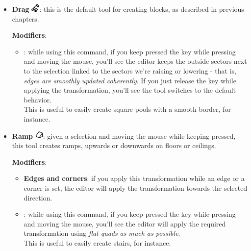 
\begin{itemize}
    \item \textbf{Drag} \includegraphics[scale=0.5]{Resources/icons_toolbox/toolbox_Drag-16.png}: this is the default tool for creating blocks, as described in previous chapters.
    \par \textbf{Modifiers}:
    \begin{itemize}
        \item \keys{\Alt}: while using this command, if you keep pressed the \keys{\Alt} key while pressing  and moving the mouse, you'll see the editor keeps the outside sectors next to the selection linked to the sectors we're raising or lowering - that is, \emph{edges are smoothly updated coherently}. If you just release the \keys{\Alt} key while applying the transformation, you'll see the tool switches to the default behavior. \\ This is useful to easily create square pools with a smooth border, for instance. 
    \end{itemize}

    \item \textbf{Ramp} \includegraphics[scale=0.5]{Resources/icons_toolbox/toolbox_GroupRamp-16.png}: given a selection and moving the mouse while keeping  pressed, this tool creates ramps, upwards or downwards on floors or ceilings.
    \par \textbf{Modifiers}:
    \begin{itemize}
        \item \textbf{Edges and corners}: if you apply this transformation while an edge or a corner is set, the editor will apply the transformation towards the selected direction.
        \item \keys{\Alt}: while using this command, if you keep pressed the \keys{\Alt} key while pressing  and moving the mouse, you'll see the editor will apply the required transformation using \emph{flat quads} \emph{as much as possible}. \\ This is useful to easily create stairs, for instance. 
    \end{itemize}


\end{itemize}

